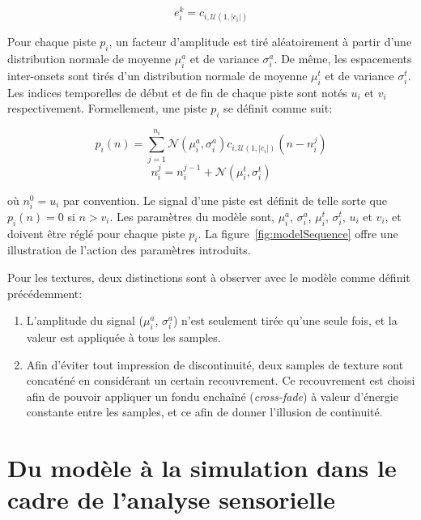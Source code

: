  \begin{equation}
 e^k_i=c_{i,\mathcal{U}(1,\vert c_i \vert)}
 \end{equation}

 Pour chaque piste $p_i$, un facteur d'amplitude est tiré aléatoirement à partir d'une distribution normale de moyenne $\mu^a_i$ et de variance $\sigma^a_i$. De même, les espacements inter-onsets sont tirés d'un distribution normale de moyenne $\mu^t_i$ et de variance $\sigma^t_i$. Les indices temporelles de début et de fin de chaque piste sont notés $u_i$ et $v_i$ respectivement. Formellement, une piste $p_i$ se définit comme suit:
 
\begin{equation}
\label{eq1}
p_{i}(n)= \sum_{j=1}^{n_i} \mathcal{N}(\mu^a_{i},\sigma^a_{i})c_{i, \mathcal{U} (1, |c_i|)}(n-n^j_i)
\end{equation}
\begin{equation}
\label{eq2}
n_i^j=n_i^{j-1} + \mathcal{N}({\mu^t_{i},\sigma^t_{i}})
\end{equation}

où $n_i^0=u_i$ par convention. Le signal d'une piste est définit de telle sorte que $p_i(n)=0$ si $n>v_i$. Les paramètres du modèle sont, $\mu^a_i$,  $\sigma^a_i$,   $\mu^t_i$,  $\sigma^t_i$, $u_i$ et $v_i$, et doivent être réglé pour chaque piste $p_i$. La figure~\ref{fig:modelSequence} offre une illustration de l'action des paramètres introduits.


Pour les textures, deux distinctions sont à observer avec le modèle comme définit précédemment: 

\begin{enumerate}
\item L'amplitude du signal ($\mu^a_i$,  $\sigma^a_i$) n'est seulement tirée qu'une seule fois, et la valeur est appliquée à tous les samples.
\item Afin d'éviter tout impression de discontinuité, deux samples de texture sont concaténé en considérant un certain recouvrement. Ce recouvrement est choisi afin de pouvoir appliquer un fondu enchaîné (\emph{cross-fade}) à valeur d'énergie constante entre les samples, et ce afin de donner l'illusion de continuité.
\end{enumerate}


\section{Du modèle à la simulation dans le cadre de l'analyse sensorielle}
\label{sec:ch4_modAnaSo}


